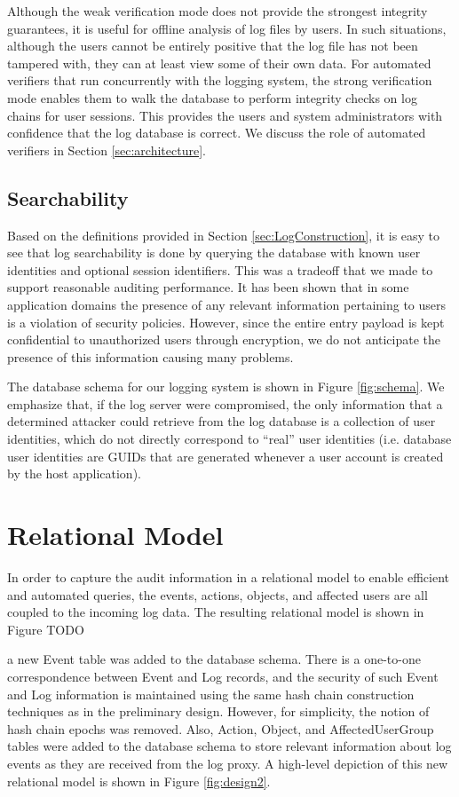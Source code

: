 \documentclass{sig-alternate}
\begin{document}
Although the weak verification mode does not provide the strongest integrity guarantees, it
is useful for offline analysis of log files by users. In such situations, although the users 
cannot be entirely positive that the log file has not been tampered with, they can at least 
view some of their own data. For automated verifiers that run concurrently with the logging system, 
the strong verification mode enables them to walk the database to perform integrity 
checks on log chains for user sessions. This provides the users and system administrators 
with confidence that the log database is correct. We discuss the role of automated
verifiers in Section \ref{sec:architecture}.

\subsection{Searchability}
Based on the definitions provided in Section \ref{sec:LogConstruction}, it is easy to 
see that log searchability is done by querying the database with known user identities and optional session 
identifiers. This was a tradeoff that we made to support reasonable auditing performance. 
It has been shown that in some application domains the presence of any relevant information
pertaining to users is a violation of security policies. However, since the entire entry payload
is kept confidential to unauthorized users through encryption, we do not anticipate the presence 
of this information causing many problems. 

The database schema for our logging system is shown in Figure \ref{fig:schema}. We emphasize that, 
if the log server were compromised, the only information that a determined attacker could retrieve from
the log database is a collection of user identities, which do not directly correspond to ``real'' user
identities (i.e. database user identities are GUIDs that are generated whenever a user account is created
by the host application). 

\section{Relational Model}
In order to capture the audit information in a relational model to enable efficient and automated queries, 
the events, actions, objects, and affected users are all coupled to the incoming log data. The resulting relational
model is shown in Figure TODO

a 
new Event table was added to the database schema. There is a one-to-one correspondence between Event 
and Log records, and the security of such Event
and Log information is maintained using the same hash chain construction techniques as in the preliminary design.
However, for simplicity, the notion of hash chain epochs was removed.
Also, Action, Object, and AffectedUserGroup tables were added to the database schema to store relevant information
about log events as they are received from the log proxy. A high-level depiction of this new relational model is shown
in Figure \ref{fig:design2}.
\end{document}
